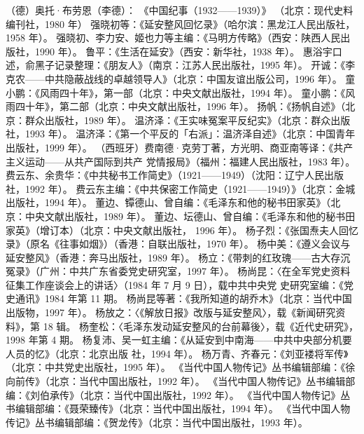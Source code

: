 \begin{thebibliography}{999}
\bibitem{} （德）奥托·布劳恩（李德）： 《中国纪事（1932——1939）》 （北京：现代史料编刊社，1980 年）
\bibitem{} 强晓初等：《延安整风回忆录》（哈尔滨：黑龙江人民出版社，1958 年）。
\bibitem{} 强晓初、李力安、姬也力等主编：《马明方传略》（西安：陕西人民出版社，1990 年）。
\bibitem{} 鲁平：《生活在延安》（西安：新华社，1938 年）。
\bibitem{} 惠浴宇口述，俞黑子记录整理：《朋友人》（南京：江苏人民出版社，1995 年）。
\bibitem{} 开诚：《李克农——中共隐蔽战线的卓越领导人》（北京：中国友谊出版公司，1996 年）。
\bibitem{} 童小鹏：《风雨四十年》，第一部（北京：中央文献出版社，1994 年）。
\bibitem{} 童小鹏：《风雨四十年》，第二部（北京：中央文献出版社，1996 年）。
\bibitem{} 扬帆：《扬帆自述》（北京：群众出版社，1989 年）。
\bibitem{} 温济泽：《王实味冤案平反纪实》（北京：群众出版社，1993 年）。
\bibitem{} 温济泽：《第一个平反的「右派」：温济泽自述》（北京：中国青年出版社，1999 年）。
\bibitem{} （西班牙）费南德·克劳丁著，方光明、商亚南等译：《共产主义运动——从共产国际到共产 党情报局》（福州：福建人民出版社，1983 年）。
\bibitem{} 费云东、余贵华：《中共秘书工作简史》（1921——1949）（沈阳：辽宁人民出版社，1992 年）。
\bibitem{} 费云东主编：《中共保密工作简史（1921——1949）》（北京：金城出版社，1994 年）。
\bibitem{} 董边、镡德山、曾自编：《毛泽东和他的秘书田家英》（北京：中央文献出版社，1989 年）。
\bibitem{} 董边、坛德山、曾自编：《毛泽东和他的秘书田家英》（增订本）（北京：中央文献出版社， 1996 年）。
\bibitem{} 杨子烈：《张国焘夫人回忆录》（原名《往事如烟》）（香港：自联出版社，1970 年）。
\bibitem{} 杨中美：《遵义会议与延安整风》（香港：奔马出版社，1989 年）。
\bibitem{} 杨立：《带刺的红玫瑰——古大存沉冤录》（广州：中共广东省委党史研究室，1997 年）。
\bibitem{} 杨尚昆：〈在全军党史资料征集工作座谈会上的讲话〉（1984 年 7 月 9 日），载中共中央党 史研究室编：《党史通讯》1984 年第 11 期。
\bibitem{} 杨尚昆等著：《我所知道的胡乔木》（北京：当代中国出版物，1997 年）。
\bibitem{} 杨放之：〈《解放日报》改版与延安整风〉，载《新闻研究资料》，第 18 辑。
\bibitem{} 杨奎松：〈毛泽东发动延安整风的台前幕後〉，载《近代史研究》，1998 年第 4 期。
\bibitem{} 杨复沛、吴一虹主编：《从延安到中南海——中共中央部分机要人员的忆》（北京：北京出版 社，1994 年）。
\bibitem{} 杨万青、齐春元：《刘亚褛将军传》（北京：中共党史出版社，1995 年）。
\bibitem{} 《当代中国人物传记》丛书编辑部编：《徐向前传》（北京：当代中国出版社，1992 年）。
\bibitem{} 《当代中国人物传记》丛书编辑部编：《刘伯承传》（北京：当代中国出版社，1992 年）。
\bibitem{} 《当代中国人物传记》丛书编辑部编：《聂荣臻传》（北京：当代中国出版社，1994 年）。
\bibitem{} 《当代中国人物传记》丛书编辑部编：《贺龙传》（北京：当代中国出版社，1993 年）。

\end{thebibliography}
